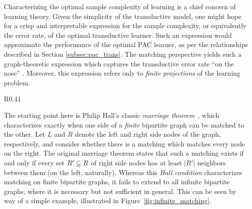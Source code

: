 Characterizing the optimal sample complexity of  learning  is a chief concern of learning theory. Given the simplicity of the transductive model, one might hope for a crisp and interpretable expression for the sample complexity, or equivalently the error rate, of the optimal transductive learner. Such an expression would approximate the performance of the optimal PAC learner, as per the relationships described  in Section \ref{subsec:pac_trans}. The matching perspective yields such a graph-theoretic expression which captures the transductive  error rate ``on the nose'' \cite{asilis_regularization_2024}. Moreover, this expression refers only to  \emph{finite projections} of the learning problem.


\begin{wrapfigure}{R}{0.41\textwidth}
  \centering
  \scalebox{1}{}
  \caption{Matching on infinite bipartite graphs absent degree constraints.}
  \label{fig:infinite_matching}
\end{wrapfigure}
The starting point here is Philip Hall's classic \emph{marriage theorem}~\cite{hall1987representatives}, which characterizes exactly when one side of a \emph{finite} bipartite graph can be matched to the other. Let $L$ and $R$ denote the left and right side nodes of the graph, respectively, and consider whether there is a matching which matches every node on the right. The original marriage theorem states that such a matching exists  if and only if every set $R' \subseteq R$ of right side nodes has at least $|R'|$ neighbors between them (on the left, naturally). Whereas this \emph{Hall condition} characterizes matching on finite bipartite graphs, it fails to extend to all infinite bipartite graphs, where it is necessary but not sufficient in general. This can be seen by way of a simple example, illustrated in Figure~\ref{fig:infinite_matching}.%


